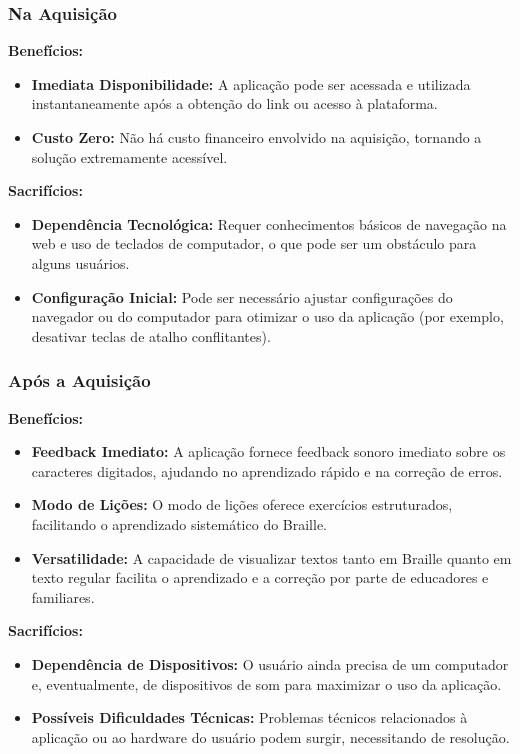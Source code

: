 \subsubsection{Na Aquisição}

\textbf{Benefícios:}

\begin{itemize}
    \item \textbf{Imediata Disponibilidade:} A aplicação pode ser acessada e utilizada instantaneamente após a obtenção do link ou acesso à plataforma.
    \item \textbf{Custo Zero:} Não há custo financeiro envolvido na aquisição, tornando a solução extremamente acessível.
\end{itemize}

\textbf{Sacrifícios:}

\begin{itemize}
    \item \textbf{Dependência Tecnológica:} Requer conhecimentos básicos de navegação na web e uso de teclados de computador, o que pode ser um obstáculo para alguns usuários.
    \item \textbf{Configuração Inicial:} Pode ser necessário ajustar configurações do navegador ou do computador para otimizar o uso da aplicação (por exemplo, desativar teclas de atalho conflitantes).
\end{itemize}

\subsubsection{Após a Aquisição}

\textbf{Benefícios:}

\begin{itemize}
    \item \textbf{Feedback Imediato:} A aplicação fornece feedback sonoro imediato sobre os caracteres digitados, ajudando no aprendizado rápido e na correção de erros.
    \item \textbf{Modo de Lições:} O modo de lições oferece exercícios estruturados, facilitando o aprendizado sistemático do Braille.
    \item \textbf{Versatilidade:} A capacidade de visualizar textos tanto em Braille quanto em texto regular facilita o aprendizado e a correção por parte de educadores e familiares.
\end{itemize}

\textbf{Sacrifícios:}

\begin{itemize}
    \item \textbf{Dependência de Dispositivos:} O usuário ainda precisa de um computador e, eventualmente, de dispositivos de som para maximizar o uso da aplicação.
    \item \textbf{Possíveis Dificuldades Técnicas:} Problemas técnicos relacionados à aplicação ou ao hardware do usuário podem surgir, necessitando de resolução.
\end{itemize}

